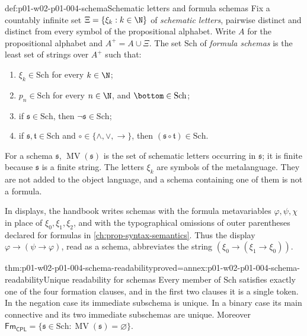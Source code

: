 \begin{hbdefinition}{def:p01-w02-p01-004-schema}{Schematic letters and formula schemas}
Fix a countably infinite set \(\Xi=\{\xi_k:k\in\N\}\) of \emph{schematic
letters}, pairwise distinct and distinct from every symbol of the
propositional alphabet. Write \(A\) for the propositional alphabet and
\(A^{+}=A\cup\Xi\). The set \(\mathrm{Sch}\) of \emph{formula schemas} is the
least set of strings over \(A^{+}\) such that:
\begin{enumerate}
  \item \(\xi_k\in\mathrm{Sch}\) for every \(k\in\N\);
  \item \(p_n\in\mathrm{Sch}\) for every \(n\in\N\), and
        \(\bottom\in\mathrm{Sch}\);
  \item if \(\mathfrak s\in\mathrm{Sch}\), then \(\neg\mathfrak s\in\mathrm{Sch}\);
  \item if \(\mathfrak s,\mathfrak t\in\mathrm{Sch}\) and
        \(\circ\in\{\land,\lor,\to\}\), then
        \((\mathfrak s\circ\mathfrak t)\in\mathrm{Sch}\).
\end{enumerate}
For a schema \(\mathfrak s\), \(\operatorname{MV}(\mathfrak s)\) is the set of
schematic letters occurring in \(\mathfrak s\); it is finite because
\(\mathfrak s\) is a finite string. The letters \(\xi_k\) are symbols of the
metalanguage. They are not added to the object language, and a schema
containing one of them is not a formula.
\end{hbdefinition}

In displays, the handbook writes schemas with the formula metavariables
\(\varphi,\psi,\chi\) in place of \(\xi_0,\xi_1,\xi_2\), and with the
typographical omissions of outer parentheses declared for formulas in
\cref{ch:prop-syntax-semantics}. Thus the display
\(\varphi\to(\psi\to\varphi)\), read as a schema, abbreviates the string
\((\xi_0\to(\xi_1\to\xi_0))\).

\begin{hbtheorem}{thm:p01-w02-p01-004-schema-readability}{proved=annex:p01-w02-p01-004-schema-readability}{Unique readability for schemas}
Every member of \(\mathrm{Sch}\) satisfies exactly one of the four formation
clauses, and in the first two clauses it is a single token. In the negation
case its immediate subschema is unique. In a binary case its main connective
and its two immediate subschemas are unique. Moreover
\(\mathsf{Fm}_{\mathsf{CPL}}=\{\mathfrak s\in\mathrm{Sch}:
\operatorname{MV}(\mathfrak s)=\varnothing\}\).
\end{hbtheorem}

